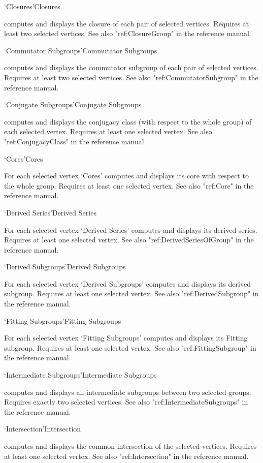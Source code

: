 \>`Closures'{Closures}

computes and displays the closure of each pair of selected vertices.
Requires at least two selected vertices. See also "ref:ClosureGroup" in the
{\GAP} reference manual.

\>`Commutator Subgroups'{Commutator Subgroups}

computes and displays  the commutator  subgroup of each pair of selected
vertices.    Requires  at  least    two   selected  vertices. See    also
"ref:CommutatorSubgroup" in the {\GAP}
reference manual.

\>`Conjugate Subgroups'{Conjugate Subgroups}

computes and displays the conjugacy  class (with  respect to the  whole
group) of each  selected vertex.  Requires  at least one selected vertex.
See also "ref:ConjugacyClass" in the {\GAP}
reference manual.

\>`Cores'{Cores}

For each selected vertex `Cores' computes and displays its core with
respect to the whole group.  Requires at least one selected vertex. See
also "ref:Core" in the {\GAP}
reference manual.

\>`Derived Series'{Derived Series}

For   each  selected vertex  `Derived  Series'  computes and displays its
derived series.   Requires  at   least  one selected vertex.    See  also
"ref:DerivedSeriesOfGroup" in the {\GAP}
reference manual.

\>`Derived Subgroups'{Derived Subgroups}

For each selected vertex `Derived Subgroups' computes and displays its
derived subgroup.  Requires at least one selected vertex.  See also
"ref:DerivedSubgroup" in the {\GAP}
reference manual.

\>`Fitting Subgroups'{Fitting Subgroups}

For each selected vertex `Fitting Subgroups' computes and displays its
Fitting subgroup.  Requires at least one selected vertex.  See also
"ref:FittingSubgroup" in the {\GAP}
reference manual.

\>`Intermediate Subgroups'{Intermediate Subgroups}

computes and displays all intermediate subgroups between two selected
groups. Requires exactly two selected vertices. See also
"ref:IntermediateSubgroups" in the {\GAP}
reference manual. 

\>`Intersection'{Intersection}

computes and displays the common intersection of the selected vertices.
Requires at least one selected vertex.  See also "ref:Intersection" in the
{\GAP} reference manual.

